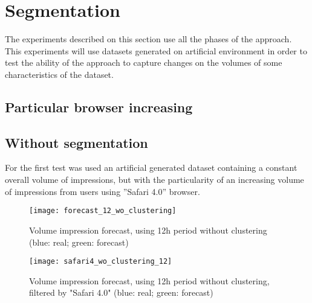 \section{Segmentation}

The experiments described on this section use all the phases of the approach.
This experiments will use datasets generated on artificial environment in order to
test the ability of the approach to capture changes on the volumes of some
characteristics of the dataset.

\subsection{Particular browser increasing}

\subsection*{Without segmentation}

For the first test was used an artificial generated dataset containing a constant overall
volume of impressions, but with the particularity of an increasing volume of
impressions from users using ''Safari 4.0'' browser. 

\begin{figure}[!ht]
\centering
\begin{minipage}[t]{0.45\linewidth}
\texttt{[image: forecast\_12\_wo\_clustering]} \caption[Volume
impression forecast, safari]{Volume impression
forecast, using 12h period without clustering (blue: real; green: forecast)}
\label{fig:vol_safari_12h_wo_clustering}
\end{minipage}
\quad
\begin{minipage}[t]{0.45\linewidth}
\texttt{[image: safari4\_wo\_clustering\_12]} \caption[Volume
impression forecast, safari 4]{Volume impression
forecast, using 12h period without clustering, filtered by "Safari 4.0" (blue: real; green: forecast)}
\label{fig:vol_safari_12h_wo_clustering_safari_4} 
\end{minipage}
\end{figure}



